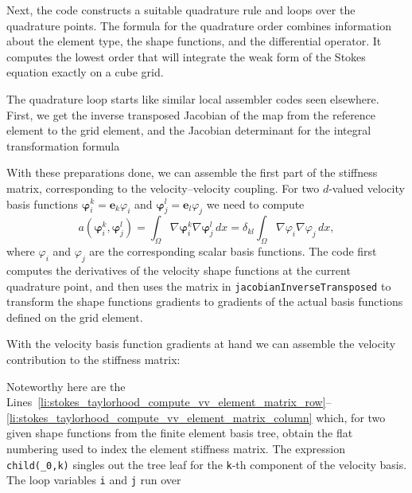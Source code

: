 \documentclass[a4paper,10pt,headings=normal,bibliography=totoc]{scrartcl}
\newcommand{\cpp}[1]{\lstinline[basicstyle=\ttfamily]!#1!}
\begin{document}
Next, the code constructs a suitable quadrature rule and loops over the quadrature points.  The formula for the quadrature
order combines information about the element type, the shape functions, and the differential operator.
It computes the lowest order that will integrate the weak form of the Stokes equation exactly
on a cube grid.
%

%
The quadrature loop starts like similar local assembler codes seen elsewhere.
First, we get the inverse transposed Jacobian
of the map from the reference element to the grid element, and the Jacobian determinant for the integral
transformation formula
%

%
With these preparations done, we can assemble the first part of the stiffness matrix,  corresponding to the
velocity--velocity coupling.  For two $d$-valued velocity basis functions $\bm{\varphi}_i^k = \mathbf{e}_k \varphi_i$
and $\bm{\varphi}_j^l = \mathbf{e}_l \varphi_j$ we need to compute
\begin{equation*}
 a(\bm{\varphi}_i^k, \bm{\varphi}_j^l)
 =
 \int_\Omega \nabla \bm{\varphi}_i^k \nabla \bm{\varphi}_j^l \,dx
 =
 \delta_{kl} \int_\Omega \nabla \varphi_i \nabla \varphi_j \,dx,
\end{equation*}
where $\varphi_i$ and $\varphi_j$ are the corresponding scalar basis functions.
The code first computes the derivatives of the velocity
shape functions at the current quadrature point,
and then uses the matrix in \cpp{jacobianInverseTransposed} to transform the shape functions gradients to
gradients of the actual basis functions defined on the grid element.
%

%
With the velocity basis function gradients at hand we can assemble the velocity contribution
to the stiffness matrix:
%

%
Noteworthy here are the Lines~\ref{li:stokes_taylorhood_compute_vv_element_matrix_row}--\ref{li:stokes_taylorhood_compute_vv_element_matrix_column} which,
for two given shape functions from the finite element basis tree, obtain the flat numbering
used to index the element stiffness matrix.  The expression \cpp{child(_0,k)} singles out the tree leaf
for the \cpp{k}-th component of the velocity basis.  The loop variables \cpp{i} and \cpp{j} run over
\end{document}
